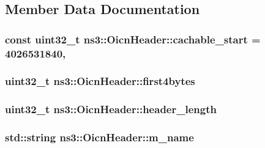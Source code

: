 \subsection{Member Data Documentation}
\hypertarget{classns3_1_1OicnHeader_af3b93655facbb38e13c98576c4454ec2}{
\subsubsection[{cachable\-\_\-start}]{\setlength{\rightskip}{0pt plus 5cm}const uint32\-\_\-t ns3\-::\-Oicn\-Header\-::cachable\-\_\-start = 4026531840\hspace{0.3cm}{\ttfamily [static]}, {\ttfamily [private]}}}\label{classns3_1_1OicnHeader_af3b93655facbb38e13c98576c4454ec2}
\hypertarget{classns3_1_1OicnHeader_ac4f7599f027c10e4433efdcb8541ef38}{
\subsubsection[{first4bytes}]{\setlength{\rightskip}{0pt plus 5cm}uint32\-\_\-t ns3\-::\-Oicn\-Header\-::first4bytes\hspace{0.3cm}{\ttfamily [private]}}}\label{classns3_1_1OicnHeader_ac4f7599f027c10e4433efdcb8541ef38}
\hypertarget{classns3_1_1OicnHeader_a4992cefc6d31c27977363db61c068111}{
\subsubsection[{header\-\_\-length}]{\setlength{\rightskip}{0pt plus 5cm}uint32\-\_\-t ns3\-::\-Oicn\-Header\-::header\-\_\-length\hspace{0.3cm}{\ttfamily [private]}}}\label{classns3_1_1OicnHeader_a4992cefc6d31c27977363db61c068111}
\hypertarget{classns3_1_1OicnHeader_a4ec6866334efab8674e2b0d96837a4ae}{
\subsubsection[{m\-\_\-name}]{\setlength{\rightskip}{0pt plus 5cm}std\-::string ns3\-::\-Oicn\-Header\-::m\-\_\-name\hspace{0.3cm}{\ttfamily [private]}}}\label{classns3_1_1OicnHeader_a4ec6866334efab8674e2b0d96837a4ae}
